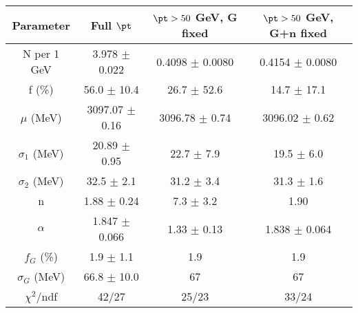 \begin{tabular}{c||c|c|c}
Parameter & Full $\pt$ & $\pt>50$ GeV, G fixed & $\pt>50$ GeV, G+n fixed \\
\hline
N per 1 GeV & 3.978 $\pm$ 0.022 & 0.4098 $\pm$ 0.0080 & 0.4154 $\pm$ 0.0080\\
f (\%) & 56.0 $\pm$ 10.4 & 26.7 $\pm$ 52.6 & 14.7 $\pm$ 17.1\\
$\mu$ (MeV) & 3097.07 $\pm$ 0.16 & 3096.78 $\pm$ 0.74 & 3096.02 $\pm$ 0.62\\
$\sigma_1$ (MeV) & 20.89 $\pm$ 0.95 & 22.7 $\pm$ 7.9 & 19.5 $\pm$ 6.0\\
$\sigma_2$ (MeV) & 32.5 $\pm$ 2.1 & 31.2 $\pm$ 3.4 & 31.3 $\pm$ 1.6\\
n & 1.88 $\pm$ 0.24 & 7.3 $\pm$ 3.2 & 1.90\\
$\alpha$ & 1.847 $\pm$ 0.066 & 1.33 $\pm$ 0.13 & 1.838 $\pm$ 0.064\\
$f_G$ (\%) & 1.9 $\pm$ 1.1 & 1.9 & 1.9\\
$\sigma_G$ (MeV) & 66.8 $\pm$ 10.0 & 67 & 67\\
\hline
$\chi^2$/ndf & 42/27 & 25/23 & 33/24\\
\end{tabular}
